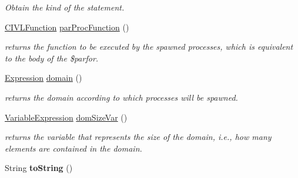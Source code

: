 \begin{DoxyCompactItemize}
\begin{DoxyCompactList}\small\item\em Obtain the kind of the statement. \end{DoxyCompactList}\item 
\hyperlink{interfaceedu_1_1udel_1_1cis_1_1vsl_1_1civl_1_1model_1_1IF_1_1CIVLFunction}{C\+I\+V\+L\+Function} \hyperlink{classedu_1_1udel_1_1cis_1_1vsl_1_1civl_1_1model_1_1common_1_1statement_1_1CommonCivlParForSpawnStatement_acba82af9d05fa4ac0546dafd89d73982}{par\+Proc\+Function} ()
\begin{DoxyCompactList}\small\item\em returns the function to be executed by the spawned processes, which is equivalent to the body of the \$parfor. \end{DoxyCompactList}\item 
\hyperlink{interfaceedu_1_1udel_1_1cis_1_1vsl_1_1civl_1_1model_1_1IF_1_1expression_1_1Expression}{Expression} \hyperlink{classedu_1_1udel_1_1cis_1_1vsl_1_1civl_1_1model_1_1common_1_1statement_1_1CommonCivlParForSpawnStatement_ad7c9f0bf61a89c5835fd73ace9fa3d23}{domain} ()
\begin{DoxyCompactList}\small\item\em returns the domain according to which processes will be spawned. \end{DoxyCompactList}\item 
\hyperlink{interfaceedu_1_1udel_1_1cis_1_1vsl_1_1civl_1_1model_1_1IF_1_1expression_1_1VariableExpression}{Variable\+Expression} \hyperlink{classedu_1_1udel_1_1cis_1_1vsl_1_1civl_1_1model_1_1common_1_1statement_1_1CommonCivlParForSpawnStatement_aa8177418a99d50c72eb34801891e2177}{dom\+Size\+Var} ()
\begin{DoxyCompactList}\small\item\em returns the variable that represents the size of the domain, i.\+e., how many elements are contained in the domain. \end{DoxyCompactList}\item 
\hypertarget{classedu_1_1udel_1_1cis_1_1vsl_1_1civl_1_1model_1_1common_1_1statement_1_1CommonCivlParForSpawnStatement_a5c3b9ca863b4b374929ce9212c047dd1}{}String {\bfseries to\+String} ()\label{classedu_1_1udel_1_1cis_1_1vsl_1_1civl_1_1model_1_1common_1_1statement_1_1CommonCivlParForSpawnStatement_a5c3b9ca863b4b374929ce9212c047dd1}


\end{DoxyCompactItemize}
